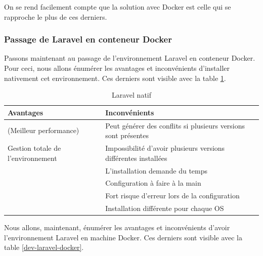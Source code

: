 \documentclass[
    iai, %
    il, %
]{heig-tb}
\begin{document}
On se rend facilement compte que la solution avec Docker est celle qui se rapproche le plus de ces derniers.

\subsubsection{Passage de Laravel en conteneur Docker}
Passons maintenant au passage de l'environnement Laravel en conteneur Docker.\newline
Pour ceci, nous allons énumérer les avantages et inconvénients d'installer nativement cet
environnement. Ces derniers sont visible avec la table \ref{dev-laravel-native}.

\begin{table}[h]
    \begin{center}
        \caption{Laravel natif \label{dev-laravel-native}}
        \begin{tabularx}{1.0\textwidth} {X|X}
            Avantages                         & Inconvénients
            \\ \hline
            (Meilleur performance)            & Peut générer des conflits si plusieurs versions sont présentes \\
            Gestion totale de l'environnement & Impossibilité d'avoir plusieurs versions différentes
            installées                                                                                         \\
                                              & L'installation demande du temps                                \\
                                              & Configuration à faire à la main                                \\
                                              & Fort risque d'erreur lors de la configuration                  \\
                                              & Installation différente pour chaque OS                         \\
        \end{tabularx}
    \end{center}
\end{table}

Nous allons, maintenant, énumérer les avantages et inconvénients d'avoir l'environnement Laravel en
machine Docker. Ces derniers sont visible avec la table \ref{dev-laravel-docker}.
\end{document}
